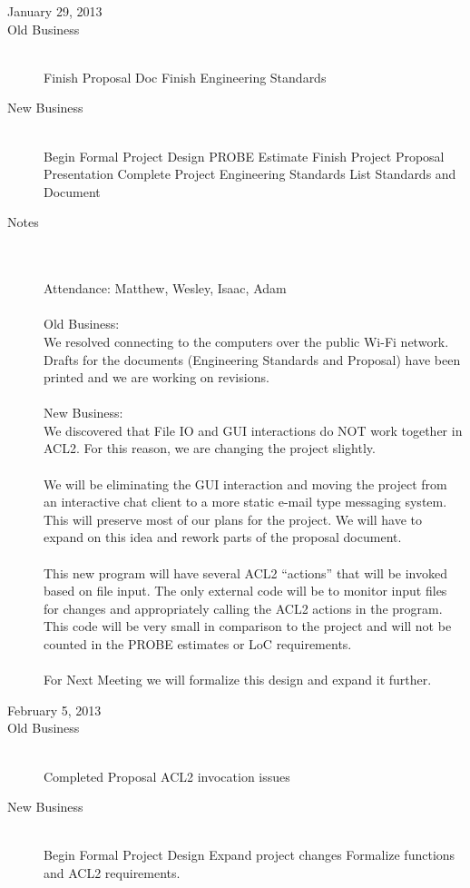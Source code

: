 \documentclass[11pt, letterpaper]{report}
\begin{document}
\begin{description}
\newpage
\item[\Large January 29, 2013]
\hypertarget{January 29, 2013} {}
\item[Old Business] \hfill \\
\subitem Finish Proposal Doc
\subitem Finish Engineering Standards
\item[New Business] \hfill \\
\subitem Begin Formal Project Design 
\subsubitem PROBE Estimate
\subitem Finish Project Proposal Presentation
\subitem Complete Project Engineering Standards
\subsubitem List Standards and Document
\item[Notes] \hfill \\ \hfill \\
Attendance:  Matthew, Wesley, Isaac, Adam\\ \\
Old Business: \\ 
We resolved connecting to the computers over the public Wi-Fi network. \\ 
Drafts for the documents (Engineering Standards and Proposal) have been printed and we are working on revisions.
\\ \\
New Business: \\ 
We discovered that File IO and GUI interactions do NOT work together in ACL2. For this reason, we are changing the project slightly.\\ \\
We will be eliminating the GUI interaction and moving the project from an interactive chat client to a more static e-mail type messaging system. This will preserve most of our plans for the project. We will have to expand on this idea and rework parts of the proposal document. \\ \\
This new program will have several ACL2 ``actions'' that will be invoked based on file input. The only external code will be to monitor input files for changes and appropriately calling the ACL2 actions in the program. This code will be very small in comparison to the project and will not be counted in the PROBE estimates or LoC requirements. \\ \\
For Next Meeting we will formalize this design and expand it further.

\newpage
\item[\Large February 5, 2013]
\hypertarget{February 5, 2013} {}
\item[Old Business] \hfill \\
\subitem Completed Proposal
\subitem ACL2 invocation issues
\item[New Business] \hfill \\
\subitem Begin Formal Project Design 
\subsubitem Expand project changes
\subsubitem Formalize functions and ACL2 requirements.


\end{description}
\end{document}
